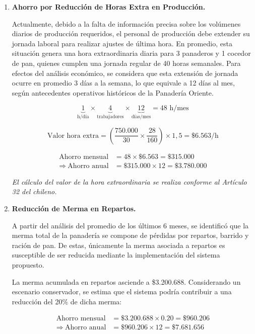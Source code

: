 \begin{enumerate}
    \item \textbf{Ahorro por Reducción de Horas Extra en Producción.}  
    
Actualmente, debido a la falta de información precisa sobre los volúmenes diarios de producción requeridos,
el personal de producción debe extender su jornada laboral para realizar ajustes de última hora.
En promedio, esta situación genera una hora extraordinaria diaria para 3 panaderos y 1 cocedor de pan,
quienes cumplen una jornada regular de 40 horas semanales.
Para efectos del análisis económico, se considera que esta extensión de jornada ocurre en promedio
3 días a la semana, lo que equivale a 12 días al mes, según antecedentes operativos históricos de la Panadería Oriente.

\[
\underbrace{1}_{\text{h/día}} \times
\underbrace{4}_{\text{trabajadores}} \times
\underbrace{12}_{\text{días/mes}}
= 48 \text{ h/mes}
\]

\[
\text{Valor hora extra} =
\left(
\frac{750.000}{30}
\times
\frac{28}{160}
\right)
\times 1{,}5
=
\text{\$}6.563/\text{h}
\]

\[
\begin{aligned}
\text{Ahorro mensual} &= 48 \times \text{\$}6.563 = \text{\$}315.000 \\[4pt]
\Rightarrow\ \text{Ahorro anual} &= \text{\$}315.000 \times 12 = \text{\$}3.780.000
\end{aligned}
\]

\textit{El cálculo del valor de la hora extraordinaria se realiza conforme al Artículo 32 del \textcite{codigotrabajo} chileno. }

    

    
\item \textbf{Reducción de Merma en Repartos.}

A partir del análisis del promedio de los últimos 6 meses, se identificó que la merma total de la panadería se compone de pérdidas por repartos, barrido y ración de pan. De estas, únicamente la merma asociada a repartos es susceptible de ser reducida mediante la implementación del sistema propuesto.

La merma acumulada en repartos asciende a \$3.200.688. Considerando un escenario conservador, se estima que el sistema podría contribuir a una reducción del 20\% de dicha merma:

\[
\begin{aligned}
\text{Ahorro mensual} &= \text{\$}3.200.688 \times 0.20 = \text{\$}960.206 \\[4pt]
\Rightarrow\ \text{Ahorro anual} &= \text{\$}960.206 \times 12 = \text{\$}7.681.656
\end{aligned}
\]



\end{enumerate}
